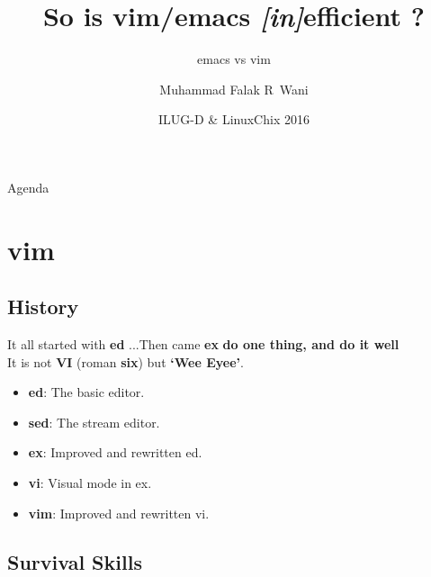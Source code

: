 \documentclass{beamer}
\title{So is vim/emacs \textit{[in]}efficient ?}
\subtitle{emacs vs vim}
\author{Muhammad Falak R~Wani \\ \inst{falakreyaz@gmail.com}}
\institute[IIIT-D] %
{
  Cybersecurity Education and Research Centre -- {\em (CERC)} \\
  Department of Computer Science\\
  IIIT-D
  \center
  \pgfuseimage{cerc-logo}
}
\date{ILUG-D \& LinuxChix 2016}
\begin{document}
\begin{frame}
	\titlepage
\end{frame}

\begin{frame}{Agenda}
	\tableofcontents
\end{frame}

\section{vim}

\subsection{History}

\begin{frame}{It all started with \textbf{ed} ...}{Then came \textbf{ex}}
	\textbf{do one thing, and do it well}\\ 
	\pause
	It is not \textbf{VI} (roman \textbf{six}) but \textbf{`Wee Eyee'}.\\
	\pause
	\begin{itemize}
		\item {
				\textbf{ed}: The basic editor.
				\pause

			}
		\item {
				\textbf{sed}: The stream editor.
				\pause

			}
		\item {
				\textbf{ex}: Improved and rewritten ed.
				\pause
			}
		\item {
				\textbf{vi}: Visual mode in ex.
				\pause
			}
		\item {
				\textbf{vim}: Improved and rewritten vi.

			}
	\end{itemize}
\end{frame}

\subsection{Survival Skills}
\end{document}
